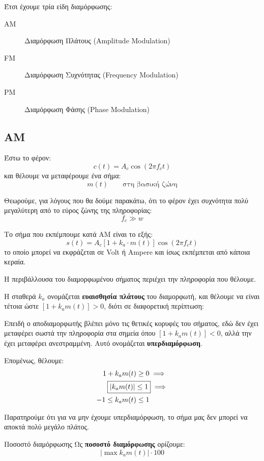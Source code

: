 \documentclass[11pt,a4paper,notitlepage,fleqn]{article}
\begin{document}
Έτσι έχουμε τρία είδη διαμόρφωσης:
\begin{description}
	\item[AM] Διαμόρφωση Πλάτους (Amplitude Modulation)
	\item[FM] Διαμόρφωση Συχνότητας (Frequency Modulation)
	\item[PM] Διαμόρφωση Φάσης (Phase Modulation)
\end{description}

\subsection{AM}
Έστω το φέρον:
\[
c(t) = A_c\cos(2\pi f_c t)
\]
και θέλουμε να μεταφέρουμε ένα σήμα:
\[
m(t) \qquad \text{στη βασική ζώνη}
\]

Θεωρούμε, για λόγους που θα δούμε παρακάτω, ότι το φέρον έχει συχνότητα πολύ μεγαλύτερη
από το εύρος ζώνης της πληροφορίας:
\[
f_c \gg w
\]

Το σήμα που εκπέμπουμε κατά AM είναι το εξής:
\[
s(t) = A_c\left[ 1 + k_a \cdot m(t) \right]\cos(2\pi f_c t)
\]
το οποίο μπορεί να εκφράζεται σε Volt ή Ampere και ίσως εκπέμπεται από κάποια κεραία.


Η περιβάλλουσα του διαμορφωμένου σήματος περιέχει την πληροφορία που θέλουμε.

Η σταθερά \( k_a \) ονομάζεται \textbf{ευαισθησία πλάτους} του διαμορφωτή, και θέλουμε
να είναι τέτοια ώστε \( \left[1 + k_a m(t)\right] > 0 \), διότι σε διαφορετική περίπτωση:


Επειδή ο αποδιαμορφωτής βλέπει μόνο τις θετικές κορυφές του σήματος, εδώ δεν έχει μεταφέρει
σωστά την πληροφορία στα σημεία όπου \(  \left[1 + k_a m(t)\right] < 0  \), αλλά την έχει
μεταφέρει ανεστραμμένη. Αυτό ονομάζεται \textbf{υπερδιαμόρφωση}.

Επομένως, θέλουμε:
\begin{align*}
	1+ k_a m(t) &\geq 0 \implies \\
	\Aboxed{\left\lvert k_a m(t) \right\rvert &\leq 1} \implies \\
	-1 \leq k_a m(t) &\leq 1
\end{align*}

Παρατηρούμε ότι για να μην έχουμε υπερδιαμόρφωση, το σήμα μας δεν μπορεί να αποκτά πολύ
μεγάλο πλάτος.

\begin{defn}{Ποσοστό διαμόρφωσης}{}
	Ως \textbf{ποσοστό διαμόρφωσης} ορίζουμε:
	\[
	\left\lvert
	\max k_a m(t)
	\right\rvert \cdot 100
	\]
\end{defn}
\end{document}
